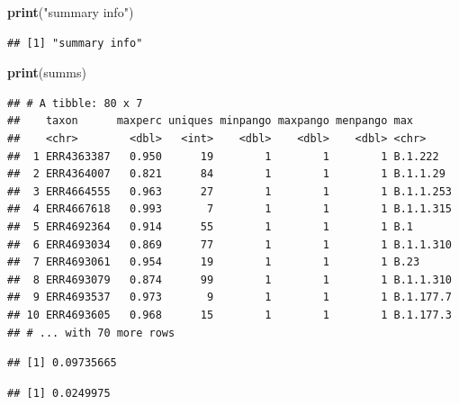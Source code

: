 \documentclass[
]{article}
\newenvironment{Shaded}{\begin{snugshade}}{\end{snugshade}}
\newcommand{\DecValTok}[1]{\textcolor[rgb]{0.00,0.00,0.81}{#1}}
\newcommand{\KeywordTok}[1]{\textcolor[rgb]{0.13,0.29,0.53}{\textbf{#1}}}
\newcommand{\NormalTok}[1]{#1}
\newcommand{\OperatorTok}[1]{\textcolor[rgb]{0.81,0.36,0.00}{\textbf{#1}}}
\newcommand{\StringTok}[1]{\textcolor[rgb]{0.31,0.60,0.02}{#1}}
\begin{document}
\begin{Shaded}
\begin{Highlighting}[]
\KeywordTok{print}\NormalTok{(}\StringTok{"summary info"}\NormalTok{)}
\end{Highlighting}
\end{Shaded}

\begin{verbatim}
## [1] "summary info"
\end{verbatim}

\begin{Shaded}
\begin{Highlighting}[]
\KeywordTok{print}\NormalTok{(summs)}
\end{Highlighting}
\end{Shaded}

\begin{verbatim}
## # A tibble: 80 x 7
##    taxon      maxperc uniques minpango maxpango menpango max      
##    <chr>        <dbl>   <int>    <dbl>    <dbl>    <dbl> <chr>    
##  1 ERR4363387   0.950      19        1        1        1 B.1.222  
##  2 ERR4364007   0.821      84        1        1        1 B.1.1.29 
##  3 ERR4664555   0.963      27        1        1        1 B.1.1.253
##  4 ERR4667618   0.993       7        1        1        1 B.1.1.315
##  5 ERR4692364   0.914      55        1        1        1 B.1      
##  6 ERR4693034   0.869      77        1        1        1 B.1.1.310
##  7 ERR4693061   0.954      19        1        1        1 B.23     
##  8 ERR4693079   0.874      99        1        1        1 B.1.1.310
##  9 ERR4693537   0.973       9        1        1        1 B.1.177.7
## 10 ERR4693605   0.968      15        1        1        1 B.1.177.3
## # ... with 70 more rows
\end{verbatim}

\begin{Shaded}
\end{Shaded}

\begin{verbatim}
## [1] 0.09735665
\end{verbatim}

\begin{verbatim}
## [1] 0.0249975
\end{verbatim}
\end{document}
